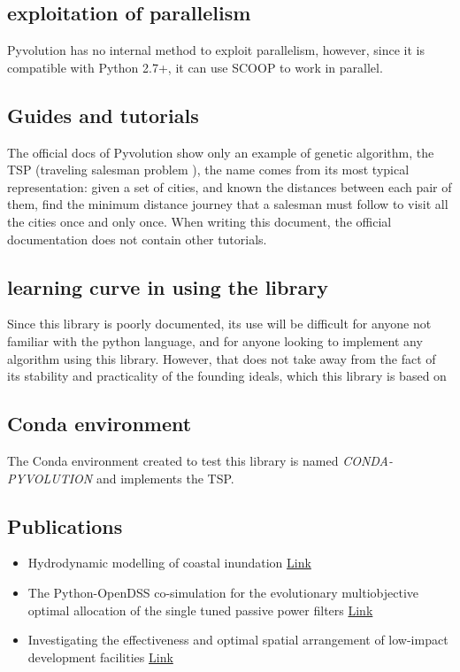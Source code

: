 \documentclass{article}
\begin{document}
	\subsection{exploitation of parallelism}
	Pyvolution has no internal method to exploit parallelism, however, since it is compatible with Python 2.7+, it can use SCOOP to work in parallel. 
	\subsection{Guides and tutorials}
	The official docs of Pyvolution show only an example of genetic algorithm, the TSP (traveling salesman problem ), the name comes from its most typical representation: given a set of cities, and known the distances between each pair of them, find the minimum distance journey that a salesman must follow to visit all the cities once and only once. When writing this document, the official documentation does not contain other tutorials.
	\subsection{learning curve in using the library}
	Since this library is poorly documented, its use will be difficult for anyone not familiar with the python language, and for anyone looking to implement any algorithm using this library. However, that does not take away from the fact of its stability and practicality of the founding ideals, which this library is based on
	\subsection{Conda environment}
	The Conda environment created to test this library is named \textit{CONDA-PYVOLUTION} and implements the TSP.
	\subsection{Publications}
	\begin{itemize}
		\item Hydrodynamic modelling of coastal inundation \href{https://www.researchgate.net/publication/264042269_Hydrodynamic_modelling_of_coastal_inundation}{Link}
		\item The Python-OpenDSS co-simulation for the evolutionary multiobjective optimal allocation of the single tuned passive power filters \href{https://ieeexplore.ieee.org/abstract/document/8188697}{Link}
		\item Investigating the effectiveness and optimal spatial arrangement of low-impact development facilities \href{https://www.sciencedirect.com/science/article/pii/S0022169419307280}{Link}
	\end{itemize}
\end{document}
